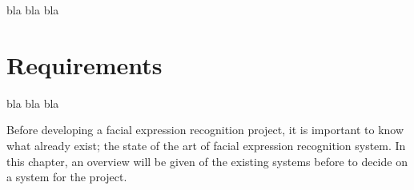 \noindent bla bla bla
\newline

\section{Requirements}

\noindent bla bla bla
\newline









\noindent Before developing a facial expression recognition project, it is important to know what already exist; the state of the art of facial expression recognition system. In this chapter, an overview will be given of the existing systems before to decide on a system for the project.
\newline
